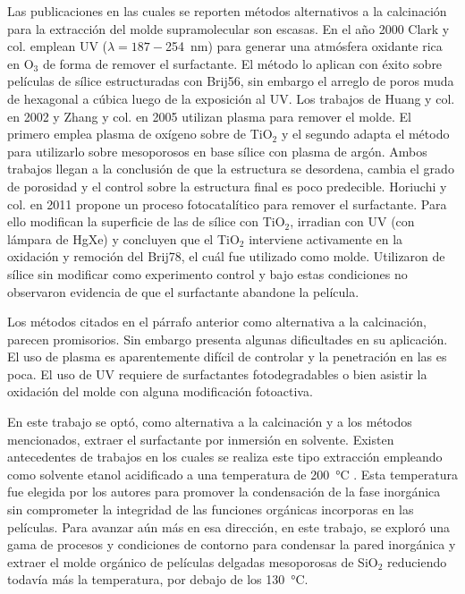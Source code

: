 	Las publicaciones en las cuales se reporten métodos alternativos a la calcinación para la extracción del molde supramolecular son escasas. En el año 2000 Clark y col.\cite{Clark2000} emplean UV ($\lambda=187-$\SI{254}{\nm}) para generar una atmósfera oxidante rica en O$_3$ de forma de remover el surfactante. El método lo aplican con éxito sobre películas de sílice estructuradas con Brij56, sin embargo el arreglo de poros muda de hexagonal a cúbica luego de la exposición al UV. Los trabajos de Huang y col. en 2002\cite{Huang2002} y Zhang y col. en 2005\cite{Zhang2005} utilizan plasma para remover el molde. El primero emplea plasma de oxígeno sobre \pdm\space de TiO$_2$ y el segundo adapta el método para utilizarlo sobre mesoporosos en base sílice con plasma de argón. Ambos trabajos llegan a la conclusión de que la estructura se desordena, cambia el grado de porosidad y el control sobre la estructura final es poco predecible. Horiuchi y col.\cite{Horiuchi2011} en 2011 propone un proceso fotocatalítico para remover el surfactante. Para ello modifican la superficie de las \pdm\space de sílice con TiO$_2$, irradian con UV (con lámpara de HgXe) y concluyen que el TiO$_2$ interviene activamente en la oxidación y remoción del Brij78, el cuál fue utilizado como molde. Utilizaron \pdm\space de sílice sin modificar como experimento control y bajo estas condiciones no observaron evidencia de que el surfactante abandone la película.

	Los métodos citados en el párrafo anterior como alternativa a la calcinación, parecen promisorios. Sin embargo presenta algunas dificultades en su aplicación. El uso de plasma es aparentemente difícil de controlar y la penetración en las \pdm\space es poca. El uso de UV requiere de surfactantes fotodegradables o bien asistir la oxidación del molde con alguna modificación fotoactiva.

	En este trabajo se optó, como alternativa a la calcinación y a los métodos mencionados, extraer el surfactante por inmersión en solvente. Existen antecedentes de trabajos en los cuales se realiza este tipo extracción empleando como solvente etanol acidificado a una temperatura de \SI{200}{\celsius} \cite{Angelome2008,Calvo20210,Calvo2010,Fuertes2009}. Esta temperatura fue elegida por los autores para promover la condensación de la fase inorgánica sin comprometer la integridad de las funciones orgánicas incorporas en las películas. Para avanzar aún más en esa dirección, en este trabajo, se exploró una gama de procesos y condiciones de contorno para condensar la pared inorgánica y extraer el molde orgánico de películas delgadas mesoporosas de SiO$_2$ reduciendo todavía más la temperatura, por debajo de los \SI{130}{\celsius}.

